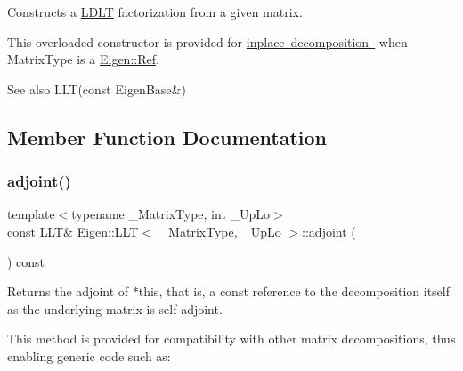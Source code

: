 Constructs a \mbox{\hyperlink{class_eigen_1_1_l_d_l_t}{L\+D\+LT}} factorization from a given matrix. 

This overloaded constructor is provided for \mbox{\hyperlink{}{inplace decomposition }} when {\ttfamily Matrix\+Type} is a \mbox{\hyperlink{class_eigen_1_1_ref}{Eigen\+::\+Ref}}.

\begin{DoxySeeAlso}{See also}
L\+L\+T(const Eigen\+Base\&) 
\end{DoxySeeAlso}


\subsection{Member Function Documentation}
\mbox{\label{class_eigen_1_1_l_l_t_a559aba3a7c41f7fc87ec84327bb72ccd}} 
\subsubsection{\texorpdfstring{adjoint()}{adjoint()}}
{\footnotesize\ttfamily template$<$typename \+\_\+\+Matrix\+Type, int \+\_\+\+Up\+Lo$>$ \\
const \mbox{\hyperlink{class_eigen_1_1_l_l_t}{L\+LT}}\& \mbox{\hyperlink{class_eigen_1_1_l_l_t}{Eigen\+::\+L\+LT}}$<$ \+\_\+\+Matrix\+Type, \+\_\+\+Up\+Lo $>$\+::adjoint (\begin{DoxyParamCaption}{ }\end{DoxyParamCaption}) const\hspace{0.3cm}{\ttfamily [inline]}}

\begin{DoxyReturn}{Returns}
the adjoint of {\ttfamily $\ast$this}, that is, a const reference to the decomposition itself as the underlying matrix is self-\/adjoint.
\end{DoxyReturn}
This method is provided for compatibility with other matrix decompositions, thus enabling generic code such as\+: 
\begin{DoxyCode}{0}
\end{DoxyCode}
 \mbox{\label{class_eigen_1_1_l_l_t_aecb45daf711328e0804f272131142b57}} 
